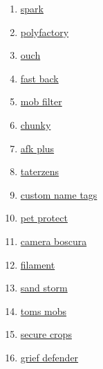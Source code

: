 \begin{enumerate}
    \item \href{https://github.com/lucko/spark}{spark}
    \item \href{https://github.com/patbox/PolyFactory}{polyfactory}
    \item \href{https://github.com/patbox/ouch}{ouch}
    \item \href{https://github.com/pcal43/fastback}{fast back}
    \item \href{https://github.com/pcal43/mob-filter}{mob filter}
    \item \href{https://github.com/pop4959/Chunky}{chunky}
    \item \href{https://github.com/sakura-ryoko/afkplus}{afk plus}
    \item \href{https://github.com/samolego/Taterzens/}{taterzens}
    \item \href{https://github.com/senseiwells/CustomNameTags}{custom name tags}
    \item \href{https://github.com/sylvxa/petprotect}{pet protect}
    \item \href{https://github.com/tomalbrc/camera-obscura}{camera boscura}
    \item \href{https://github.com/tomalbrc/filament}{filament}
    \item \href{https://github.com/tomalbrc/sandstorm}{sand storm}
    \item \href{https://github.com/tomalbrc/toms-mobs/}{toms mobs}
    \item \href{https://github.com/zekk051/secure-crops}{secure crops}
    \item \href{https://github.com/bloodmc/GriefDefender}{grief defender}
\end{enumerate}


